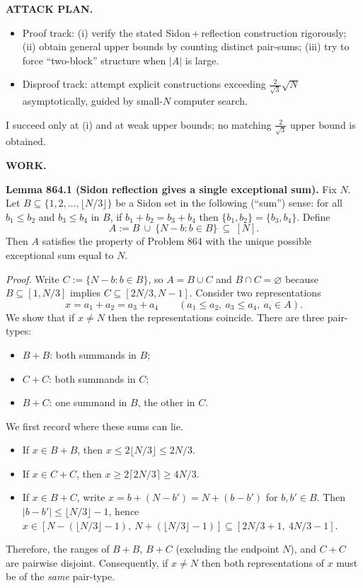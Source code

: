 \medskip
\noindent\textbf{ATTACK PLAN.}
\begin{itemize}
\item Proof track: (i) verify the stated Sidon\,+\,reflection construction rigorously; (ii) obtain general upper bounds by counting distinct pair-sums; (iii) try to force ``two-block'' structure when $|A|$ is large.
\item Disproof track: attempt explicit constructions exceeding $\tfrac{2}{\sqrt 3}\sqrt N$ asymptotically, guided by small-$N$ computer search.
\end{itemize}
I succeed only at (i) and at weak upper bounds; no matching $\tfrac{2}{\sqrt 3}$ upper bound is obtained.

\medskip
\noindent\textbf{WORK.}

\medskip
\noindent\textbf{Lemma 864.1 (Sidon reflection gives a single exceptional sum).}
Fix $N$. Let $B\subseteq \{1,2,\dots,\lfloor N/3\rfloor\}$ be a Sidon set in the following (``sum'') sense:
for all $b_1\le b_2$ and $b_3\le b_4$ in $B$, if $b_1+b_2=b_3+b_4$ then $\{b_1,b_2\}=\{b_3,b_4\}$.
Define
\[
A:=B\ \cup\ \{N-b: b\in B\}\ \subseteq\ [N].
\]
Then $A$ satisfies the property of Problem 864 with the unique possible exceptional sum equal to $N$.

\smallskip
\noindent\emph{Proof.}
Write $C:=\{N-b:b\in B\}$, so $A=B\cup C$ and $B\cap C=\varnothing$ because $B\subseteq[1,N/3]$ implies $C\subseteq[2N/3,N-1]$.
Consider two representations
\[
x=a_1+a_2=a_3+a_4\qquad (a_1\le a_2,\ a_3\le a_4,\ a_i\in A).
\]
We show that if $x\ne N$ then the representations coincide.
There are three pair-types:
\begin{itemize}
\item[(1)] $B+B$: both summands in $B$;
\item[(2)] $C+C$: both summands in $C$;
\item[(3)] $B+C$: one summand in $B$, the other in $C$.
\end{itemize}
We first record where these sums can lie.
\begin{itemize}
\item If $x\in B+B$, then $x\le 2\lfloor N/3\rfloor\le 2N/3$.
\item If $x\in C+C$, then $x\ge 2\lceil 2N/3\rceil\ge 4N/3$.
\item If $x\in B+C$, write $x=b+(N-b')=N+(b-b')$ for $b,b'\in B$. Then $|b-b'|\le \lfloor N/3\rfloor-1$, hence
$x\in [N-(\lfloor N/3\rfloor-1),\ N+(\lfloor N/3\rfloor-1)]\subseteq [2N/3+1,\ 4N/3-1]$.
\end{itemize}
Therefore, the ranges of $B+B$, $B+C$ (excluding the endpoint $N$), and $C+C$ are pairwise disjoint.
Consequently, if $x\ne N$ then both representations of $x$ must be of the \emph{same} pair-type.

